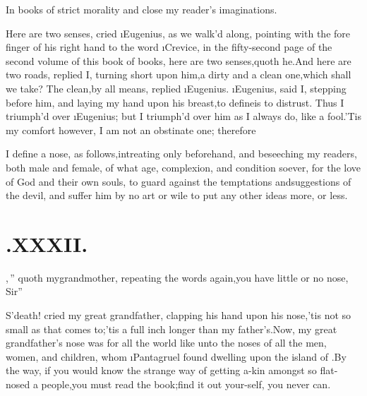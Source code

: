 \documentclass[twoside]{article}
\begin{document}
In books of strict morality and close
my reader’s imaginations.

\tsh Here are two senses, cried \i{Eu\-genius}, as we walk’d
along, pointing with the fore finger of his right hand to the
word \i{Crevice}, in the fifty-second page of the second
volume of this book of books,
\tsh here are two senses,\tsk quoth he.\tsk And here are two
roads, replied I, turning short upon him,\tsh a dirty and a
clean one,\tsh which shall we take?\tsk\break
The clean,\tsk by all means, replied \i{Eu\-genius}.  \i{Eugenius},
said I, stepping before him, and laying my hand upon his\break
breast,\tsh to define\tsh is to distrust.\tsh\break
Thus I triumph’d over \i{Eugenius}; but I\break
triumph’d over him as I always do, like a fool.\tsh ’Tis my comfort however, I
am not an obstinate one; therefore

I define a nose, as follows,\tsk intreat\-ing only beforehand, and
beseeching my readers, both male and female, of what age,
complexion, and condition soever, for the love of God and their own
souls, to guard against the temptations and\break suggestions of the
devil, and suffer him by no art or wile to put any other
ideas
more, or less.

\section{\chapstrut {}.\quad  XXXII.}

,\,”
quoth my\break grandmother, repeating the\break
words again,\tsk\lqq you have little or no\break
\lqq nose, Sir”\tsh

S’death! cried my great grandfather, clapping his hand
upon his nose,\tsk ’tis not so small as that comes
to;\tsk ’tis a full inch longer than my
father’s.\tsh Now, my great grandfather’s nose was
for all
the world like unto the noses of all the 
men, women, and children, whom \i{Pan\-tagruel} found dwelling upon the
island of 
.\tsh By the way, if you would 
know the strange way of getting a-kin 
amongst so flat-nosed a people,\tsh you
must read the book;\tsk find it out your-\break self,
you never can.\tsh
\end{document}
